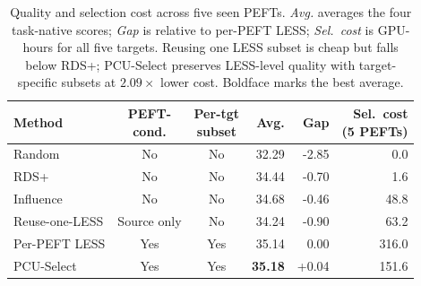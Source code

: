 \begin{table}[t]
\centering
\small
\setlength{\tabcolsep}{2.5pt}
\caption{Quality and selection cost across five seen PEFTs. \emph{Avg.} averages the four task-native scores; \emph{Gap} is relative to per-PEFT LESS; \emph{Sel.\ cost} is GPU-hours for all five targets. Reusing one LESS subset is cheap but falls below RDS+; PCU-Select preserves LESS-level quality with target-specific subsets at $2.09\times$ lower cost. Boldface marks the best average.}
\label{tab:reuse-quality-cost}
\begin{tabular}{lccrrr}
\toprule
Method & \shortstack{PEFT-\\cond.} & \shortstack{Per-tgt\\subset} & Avg. & Gap & \shortstack{Sel.\ cost\\(5 PEFTs)} \\
\midrule
Random & No & No & 32.29 & -2.85 & 0.0 \\
RDS+ & No & No & 34.44 & -0.70 & 1.6 \\
Influence & No & No & 34.68 & -0.46 & 48.8 \\
\midrule
Reuse-one-LESS & Source only & No & 34.24 & -0.90 & 63.2 \\
Per-PEFT LESS & Yes & Yes & 35.14 & 0.00 & 316.0 \\
PCU-Select & Yes & Yes & \textbf{35.18} & +0.04 & 151.6 \\
\bottomrule
\end{tabular}
\end{table}
